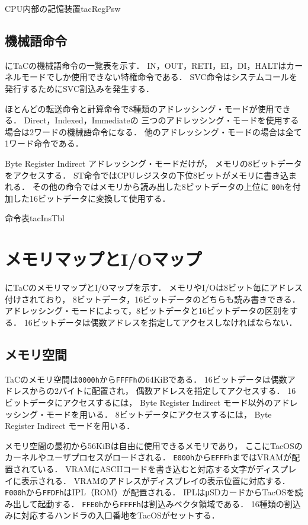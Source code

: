 {CPU内部の記憶装置}{tacRegPsw}

\subsection{機械語命令}
にTaCの機械語命令の一覧表を示す．
IN，OUT，RETI，EI，DI，HALTはカーネルモードでしか使用できない特権命令である．
SVC命令はシステムコールを発行するためにSVC割込みを発生する．

ほとんどの転送命令と計算命令で8種類のアドレッシング・モードが使用できる．
Direct，Indexed，Immediateの
三つのアドレッシング・モードを使用する場合は2ワードの機械語命令になる．
他のアドレッシング・モードの場合は全て1ワード命令である．

Byte Register Indirect アドレッシング・モードだけが，
メモリの8ビットデータをアクセスする．
ST命令ではCPUレジスタの下位8ビットがメモリに書き込まれる．
その他の命令ではメモリから読み出した8ビットデータの上位に
{\tt 00h}を付加した16ビットデータに変換して使用する．

{命令表}{tacInsTbl}

\newpage
\section{メモリマップとI/Oマップ}
にTaCのメモリマップとI/Oマップを示す．
メモリやI/Oは8ビット毎にアドレス付けされており，
8ビットデータ，16ビットデータのどちらも読み書きできる．
アドレッシング・モードによって，8ビットデータと16ビットデータの区別をする．
16ビットデータは偶数アドレスを指定してアクセスしなければならない．

\subsection{メモリ空間}
TaCのメモリ空間は{\tt 0000h}から{\tt FFFFh}の64KiBである．
16ビットデータは偶数アドレスからの2バイトに配置され，
偶数アドレスを指定してアクセスする．
16ビットデータにアクセスするには，
Byte Register Indirect モード以外のアドレッシング・モードを用いる．
8ビットデータにアクセスするには，
Byte Register Indirect モードを用いる．

メモリ空間の最初から56KiBは自由に使用できるメモリであり，
ここにTacOSのカーネルやユーザプロセスがロードされる．
{\tt E000h}から{\tt EFFFh}まではVRAMが配置されている．
VRAMにASCIIコードを書き込むと対応する文字がディスプレイに表示される．
VRAMのアドレスがディスプレイの表示位置に対応する．
{\tt F000h}から{\tt FFDFh}はIPL（ROM）が配置される．
IPLはμSDカードからTacOSを読み出して起動する．
{\tt FFE0h}から{\tt FFFFh}は割込みベクタ領域である．
16種類の割込みに対応するハンドラの入口番地をTacOSがセットする．

